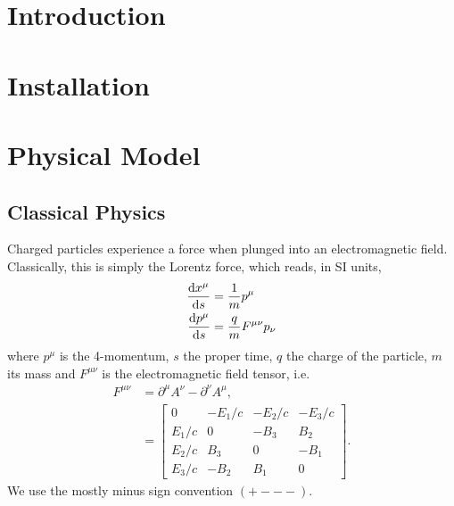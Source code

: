 \documentclass[10pt,letterpaper,extrafontsizes, onecolumn,openright]{memoir}
\begin{document}
\chapter{Introduction}

\chapter{Installation}

\chapter{Physical Model}

\section{Classical Physics}

Charged particles experience a force when plunged into an electromagnetic field.
Classically, this is simply the Lorentz force, which reads, in SI units,
  \begin{subequations}
  \begin{align}
    \dv{x^\mu}{s} &= \frac{1}{m}p^\mu \\
    \dv{p^\mu}{s} &= \frac{q}{m}F^{\mu\nu}p_\nu
  \end{align}
  \end{subequations}
where $p^\mu$ is the 4-momentum, $s$ the proper time, $q$ the charge of the
particle, $m$ its mass and $F^{\mu\nu}$ is the electromagnetic field tensor, i.e.
  \begin{subequations}
  \begin{align}
    F^{\mu\nu} &= \partial^\mu A^\nu - \partial^\nu A^\mu, \\
               &= \begin{bmatrix}
                    0      & -E_1/c     & -E_2/c     & -E_3/c \\
                    E_1/c  & 0          & -B_3       & B_2     \\
                    E_2/c  & B_3        & 0          & -B_1    \\
                    E_3/c  & -B_2       & B_1        & 0
                  \end{bmatrix}.
  \end{align}
  \end{subequations}
We use the mostly minus sign convention $(+---)$.
\end{document}
